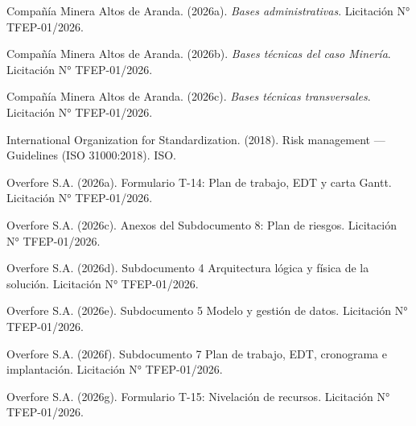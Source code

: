 \documentclass[formulario]{../../comun/overfore}
\begin{document}
\begin{referencias}
\item Compañía Minera Altos de Aranda. (2026a). \emph{Bases administrativas}. Licitación N° TFEP-01/2026.
\item Compañía Minera Altos de Aranda. (2026b). \emph{Bases técnicas del caso Minería}. Licitación N° TFEP-01/2026.
\item Compañía Minera Altos de Aranda. (2026c). \emph{Bases técnicas transversales}. Licitación N° TFEP-01/2026.
\item International Organization for Standardization. (2018). Risk management — Guidelines (ISO 31000:2018). ISO.
\item Overfore S.A. (2026a). Formulario T-14: Plan de trabajo, EDT y carta Gantt. Licitación N° TFEP-01/2026.
\item Overfore S.A. (2026c). Anexos del Subdocumento 8: Plan de riesgos. Licitación N° TFEP-01/2026.
\item Overfore S.A. (2026d). Subdocumento 4 Arquitectura lógica y física de la solución. Licitación N° TFEP-01/2026.
\item Overfore S.A. (2026e). Subdocumento 5 Modelo y gestión de datos. Licitación N° TFEP-01/2026.
\item Overfore S.A. (2026f). Subdocumento 7 Plan de trabajo, EDT, cronograma e implantación. Licitación N° TFEP-01/2026.
\item Overfore S.A. (2026g). Formulario T-15: Nivelación de recursos. Licitación N° TFEP-01/2026.
\end{referencias}
\end{document}
